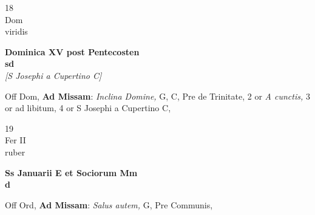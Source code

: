 \documentclass[10pt, openany]{book}
\begin{document}
        \begin{center}
            \begin{minipage}{3.5in}
                \vspace{2em}
                \begin{minipage}{0.5in}
                    {\Huge 18} \\
                    {\normalsize Dom} \\
                    {\normalsize viridis}
                \end{minipage}
                \begin{minipage}{3.0in}
                    \textbf{ \large Dominica XV post Pentecosten \\
                    \textnormal{\normalsize sd}} \\ \textit{[S Josephi a Cupertino C]} \\ 
                \end{minipage}
                \begin{justify}Off Dom, \textbf{Ad Missam}: \textit{Inclina Domine,} G, C, Pre de Trinitate, 2 or \textit{A cunctis,} 3 or ad libitum, 4 or S Josephi a Cupertino C,  
                \end{justify}
            \end{minipage}
        \end{center}
    
        \begin{center}
            \begin{minipage}{3.5in}
                \vspace{2em}
                \begin{minipage}{0.5in}
                    {\Huge 19} \\
                    {\normalsize Fer II} \\
                    {\normalsize ruber}
                \end{minipage}
                \begin{minipage}{3.0in}
                    \textbf{ \large Ss Januarii E et Sociorum Mm \\
                    \textnormal{\normalsize d}} \\ 
                \end{minipage}
                \begin{justify}Off Ord, \textbf{Ad Missam}: \textit{Salus autem,} G, Pre Communis,  
                \end{justify}
            \end{minipage}
        \end{center}
    
\end{document}
